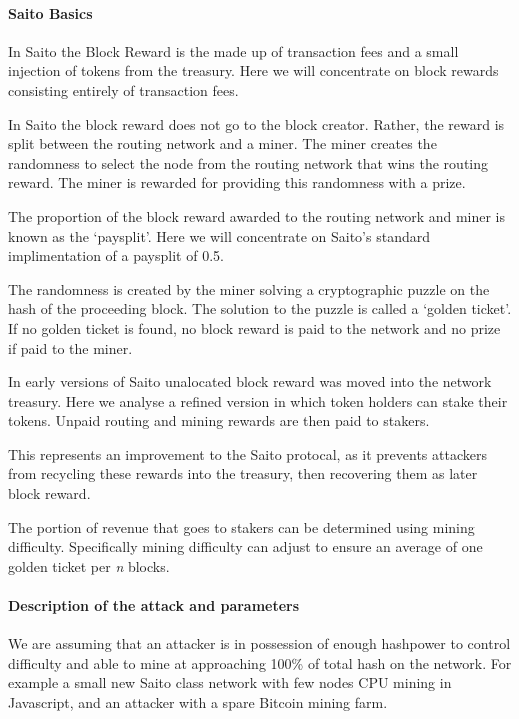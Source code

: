 \documentclass[
]{article}
\begin{document}
\hypertarget{saito-basics}{%
\paragraph{Saito Basics}\label{saito-basics}}

In Saito the Block Reward is the made up of transaction fees and a small
injection of tokens from the treasury. Here we will concentrate on block
rewards consisting entirely of transaction fees.

In Saito the block reward does not go to the block creator. Rather, the
reward is split between the routing network and a miner. The miner
creates the randomness to select the node from the routing network that
wins the routing reward. The miner is rewarded for providing this
randomness with a prize.

The proportion of the block reward awarded to the routing network and
miner is known as the `paysplit'. Here we will concentrate on Saito's
standard implimentation of a paysplit of 0.5.

The randomness is created by the miner solving a cryptographic puzzle on
the hash of the proceeding block. The solution to the puzzle is called a
`golden ticket'. If no golden ticket is found, no block reward is paid
to the network and no prize if paid to the miner.

In early versions of Saito unalocated block reward was moved into the
network treasury. Here we analyse a refined version in which token
holders can stake their tokens. Unpaid routing and mining rewards are
then paid to stakers.

This represents an improvement to the Saito protocal, as it prevents
attackers from recycling these rewards into the treasury, then
recovering them as later block reward.

The portion of revenue that goes to stakers can be determined using
mining difficulty. Specifically mining difficulty can adjust to ensure
an average of one golden ticket per \emph{n} blocks.

\hypertarget{description-of-the-attack-and-parameters}{%
\paragraph{Description of the attack and
parameters}\label{description-of-the-attack-and-parameters}}

We are assuming that an attacker is in possession of enough hashpower to
control difficulty and able to mine at approaching 100\% of total hash
on the network. For example a small new Saito class network with few
nodes CPU mining in Javascript, and an attacker with a spare Bitcoin
mining farm.
\end{document}
